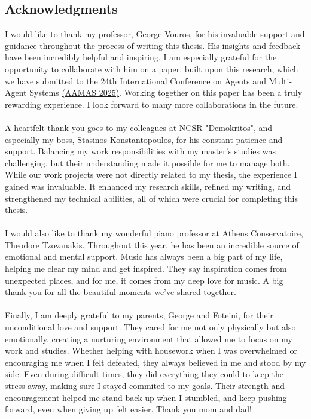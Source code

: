\subsection*{Acknowledgments}

\begin{flushleft}
    I would like to thank my professor, George Vouros, for his invaluable support and guidance throughout the process of writing this thesis. His insights and feedback have been incredibly helpful and inspiring. I am especially grateful for the opportunity to collaborate with him on a paper, built upon this research, which we have submitted to the 24th International Conference on Agents and Multi-Agent Systems \href{https://aamas2025.org/}{(AAMAS 2025)}. Working together on this paper has been a truly rewarding experience. I look forward to many more collaborations in the future. \\~\\

    A heartfelt thank you goes to my colleagues at NCSR "Demokritos", and especially my boss, Stasinos Konstantopoulos, for his constant patience and support. Balancing my work responsibilities with my master’s studies was challenging, but their understanding made it possible for me to manage both. While our work projects were not directly related to my thesis, the experience I gained was invaluable. It enhanced my research skills, refined my writing, and strengthened my technical abilities, all of which were crucial for completing this thesis. \\~\\

    I would also like to thank my wonderful piano professor at Athens Conservatoire, Theodore Tzovanakis. Throughout this year, he has been an incredible source of emotional and mental support. Music has always been a big part of my life, helping me clear my mind and get inspired. They say inspiration comes from unexpected places, and for me, it comes from my deep love for music. A big thank you for all the beautiful moments we've shared together. \\~\\

    Finally, I am deeply grateful to my parents, George and Foteini, for their unconditional love and support. They cared for me not only physically but also emotionally, creating a nurturing environment that allowed me to focus on my work and studies. Whether helping with housework when I was overwhelmed or encouraging me when I felt defeated, they always believed in me and stood by my side. Even during difficult times, they did everything they could to keep the stress away, making sure I stayed commited to my goals. Their strength and encouragement helped me stand back up when I stumbled, and keep pushing forward, even when giving up felt easier. Thank you mom and dad!
\end{flushleft}

